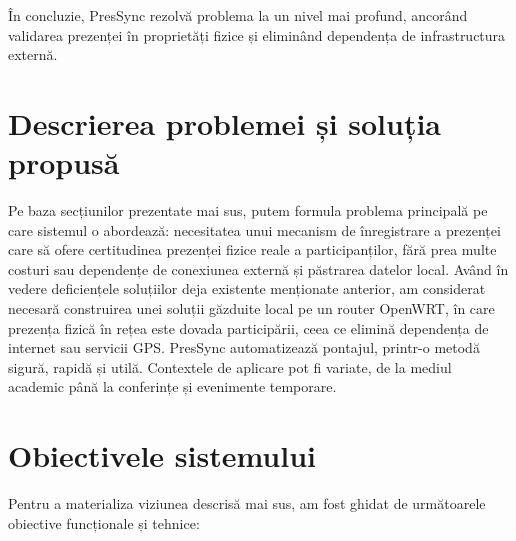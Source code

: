 \documentclass[a4paper,12pt,oneside]{report}
\begin{document}
În concluzie, PresSync rezolvă problema la un nivel mai profund, ancorând validarea prezenței în proprietăți fizice și eliminând dependența de infrastructura externă.

\section{Descrierea problemei și soluția propusă}


Pe baza secțiunilor prezentate mai sus, putem formula problema principală pe care sistemul o abordează: necesitatea unui mecanism de înregistrare a prezenței care să ofere certitudinea prezenței fizice reale a participanților, fără prea multe costuri sau dependențe de conexiunea externă și păstrarea datelor local.
Având în vedere deficiențele soluțiilor deja existente menționate anterior, am considerat necesară construirea unei soluții găzduite local pe un router OpenWRT, în care prezența fizică în rețea este dovada participării, ceea ce elimină dependența de internet sau servicii GPS. PresSync automatizează pontajul, printr-o metodă sigură, rapidă și utilă. Contextele de aplicare pot fi variate, de la mediul academic până la conferințe și evenimente temporare.

\section{Obiectivele sistemului}

Pentru a materializa viziunea descrisă mai sus, am fost ghidat de următoarele obiective funcționale și tehnice:
\end{document}

